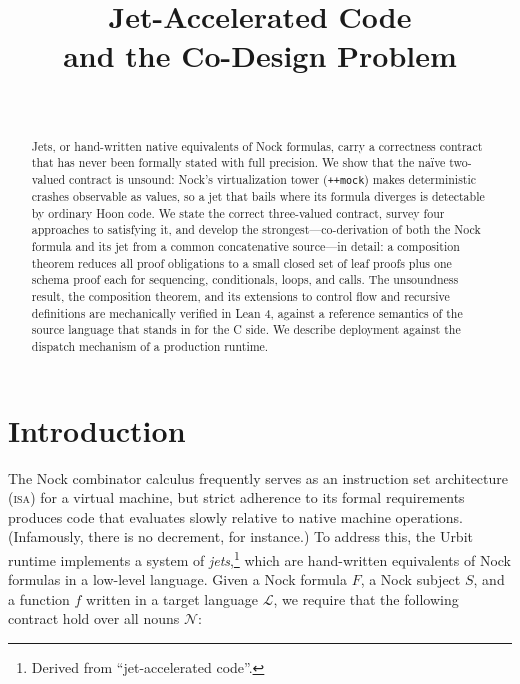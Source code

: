 \documentclass[twoside]{article}
\title{Jet-Accelerated Code\\and the Co-Design Problem}
\author{\authorname~\authorpatp \\ \affiliation}
\date{}
\begin{document}
\maketitle
\thispagestyle{firststyle}

\begin{abstract}
Jets, or hand-written native equivalents of Nock formulas, carry a correctness contract that has never been formally stated with full precision.  We show that the na\"{i}ve two-valued contract is unsound:  Nock's virtualization tower (\lstinline[style=inlinecode]{++mock}) makes deterministic crashes observable as values, so a jet that bails where its formula diverges is detectable by ordinary Hoon code.  We state the correct three-valued contract, survey four approaches to satisfying it, and develop the strongest---co-derivation of both the Nock formula and its jet from a common concatenative source---in detail:  a composition theorem reduces all proof obligations to a small closed set of leaf proofs plus one schema proof each for sequencing, conditionals, loops, and calls.  The unsoundness result, the composition theorem, and its extensions to control flow and recursive definitions are mechanically verified in Lean 4, against a reference semantics of the source language that stands in for the C side.  We describe deployment against the dispatch mechanism of a production runtime.
\end{abstract}

\setcounter{page}{1}

\tableofcontents

\section{Introduction}

The Nock combinator calculus frequently serves as an instruction set architecture (\textsc{isa}) for a virtual machine, but strict adherence to its formal requirements produces code that evaluates slowly relative to native machine operations.  (Infamously, there is no decrement, for instance.)  To address this, the Urbit runtime implements a system of \emph{jets},\footnote{Derived from ``jet-accelerated code''.} which are hand-written equivalents of Nock formulas in a low-level language.  Given a Nock formula $F$, a Nock subject $S$, and a function $f$ written in a target language $\mathcal{L}$, we require that the following contract hold over all nouns $\mathcal{N}$:
\end{document}
